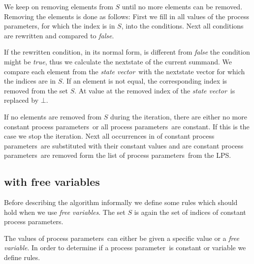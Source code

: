 \index{}\documentclass[a4paper,10pt]{article}
\theoremstyle{plain}
\theoremstyle{definition}
\newcommand{\pp}{process parameter}
\newcommand{\pps}{process parameters}
\newcommand{\ti}{\textit}
\newcommand{\sv}{\textit{state vector}}
\begin{document}
We keep on removing elements from $S$ until no more elements can be removed. Removing the elements is done as follows:
First we fill in all values of the \pps , for which the index is in $S$, into the conditions. Next all conditions are rewritten and compared to \ti{false}.

If the rewritten condition, in its normal form, is different from \ti{false} the condition might be \ti{true}, thus we calculate the nextstate of the current summand.  We compare each element from the \sv\ with the nextstate vector for which the indices are in $S$. If an element is not equal, the corresponding index is removed from the set $S$. 
At value at the removed index of the \sv\ is replaced by $\bot$. 

If no elements are removed from $S$ during the iteration, there are either no more constant \pps\ or all \pps\ are constant. If this is the case we stop the iteration. Next all occurrences in of constant \pps\ are substituted with their constant values and are constant \pps\ are removed form the list of \pps\ from the LPS. 

\subsection{with free variables}
Before describing the algorithm informally we define some rules which should hold when we use \ti{free variables}. The set  $S$ is again the set of indices of constant \pps .

The values of \pps\ can either be given a specific value or a \ti{free variable}. In order to determine if a \pp\ is constant or variable we define rules.
\end{document}
